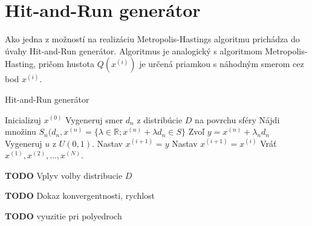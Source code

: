 \section{Hit-and-Run generátor}

Ako jedna z možností na realizáciu Metropolis-Hastings algoritmu prichádza do úvahy Hit-and-Run generátor. Algoritmus je analogický s algoritmom Metropolis-Hasting, pričom hustota $Q(x^{(i)})$ je určená priamkou s náhodným smerom cez bod $x^{(i)}$.

\begin{algorithm}[H]
	\caption{Hit-and-Run generátor \cite{hit-and-run_chen}}
	\label{hit-and-run}
	\begin{algorithmic}[1]
		\State Inicializuj $x^{(0)}$
			\State Vygeneruj smer $d_n$ z distribúcie $D$ na povrchu sféry
			\State Nájdi množinu $S_n(d_n,x^{(n)}=\{\lambda \in \mathbb{R}; x^{(n)} + \lambda d_n \in S \} $
			\State Zvoľ $y=x^{(n)}+\lambda_n d_n$
			\State Vygeneruj $u$ z $U(0,1)$.
				\State Nastav $x^{(i+1)}=y$
			\Else
				\State Nastav $x^{(i+1)}=x^{(i)}$
			\EndIf
		\EndFor
		\State Vráť $x^{(1)},x^{(2)},\dots,x^{(N)}$.
	\end{algorithmic}
\end{algorithm}

\textbf{TODO} Vplyv volby distribucie $D$

\textbf{TODO} Dokaz konvergentnosti, rychlost \cite{hit-and-run_chen}

\textbf{TODO} vyuzitie pri polyedroch
